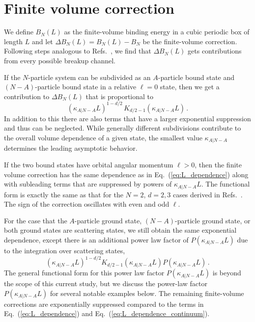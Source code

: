 \documentclass[aps,singlecolumn,superscriptaddress,nofootinbib,tightenlines,
preprintnumbers,showkeys]{revtex4-1}
\begin{document}
\section{Finite volume correction}

We define $B_N(L)$ as the finite-volume binding energy in a cubic periodic box
of length $L$ and let $\Delta B_N(L) = B_N(L) - B_N$ be the finite-volume 
correction.  Following steps analogous to 
Refs.~\cite{Luscher:1985dn,Konig:2011nz,Konig:2011ti,Meissner:2014dea}, we find 
that $\Delta B_N(L)$ gets contributions from every possible breakup channel.

If the $N$-particle system can be subdivided as an $A$-particle bound state and
$(N{-}A)$-particle bound state in a relative $\ell = 0$ state, then we get a 
contribution to $\Delta B_N(L)$ that is proportional to
%
\begin{equation}
 (\kappa_{ A|N-A}L)^{1-d/2} \, K_{d/2-1}(\kappa_{ A|N-A}L) \,.
\label{eq:L_dependence}
\end{equation}  
%
In addition to this there are also terms that have a larger exponential
suppression and thus can be neglected.  While generally different subdivisions 
contribute to the overall volume dependence of a given state, the smallest value 
$\kappa_{A|N{-}A}$ determines the leading asymptotic behavior.

If the two bound states have orbital angular momentum $\ell > 0$, then the 
finite volume correction has the same dependence as in 
Eq.~(\ref{eq:L_dependence}) along with subleading terms that are suppressed by 
powers of $\kappa_{A|N-A}L$.  The functional form is exactly the same as that 
for the $N=2$, $d=2,3$ cases derived in Refs.~\cite{Konig:2011nz,Konig:2011ti}. 
The sign of the correction oscillates with even and odd $\ell$.

For the case that the $A$-particle ground state, $(N{-}A)$-particle ground 
state, or both ground states are scattering states, we still obtain the same 
exponential dependence, except there is an additional power law factor of
$P(\kappa_{A|N-A}L)$ due to the integration over scattering states,
%
\begin{equation}
 (\kappa_{ A|N-A}L)^{1-d/2} K_{d/2-1}(\kappa_{ A|N-A}L)P(\kappa_{A|N-A}L) \,.
\label{eq:L_dependence_continuum}
\end{equation}
%
The general functional form for this power law factor $P(\kappa_{A|N-A}L)$ is 
beyond the scope of this current study, but we discuss the power-law factor 
$P(\kappa_{ A|N-A}L)$ for several notable examples below.  The remaining 
finite-volume corrections are exponentially suppressed compared to the terms in 
Eq.~(\ref{eq:L_dependence}) and Eq.~(\ref{eq:L_dependence_continuum}).
\end{document}
